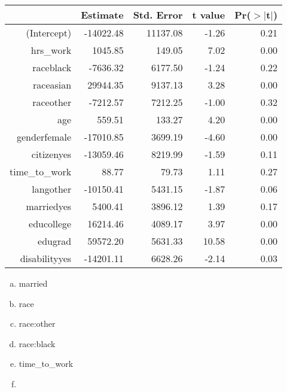 \documentclass[slidestop,compress,mathserif,12pt,t,professionalfonts,xcolor=table]{beamer}
\newcommand{\solnMult}[1]{#1}
\begin{document}

\begin{frame}
\frametitle{}


\begin{center}
{\tiny
\begin{tabular}{rrrrr}
  \hline
 & Estimate & Std. Error & t value & Pr($>$$|$t$|$) \\ 
  \hline
(Intercept) & -14022.48 & 11137.08 & -1.26 & 0.21 \\ 
  hrs\_work & 1045.85 & 149.05 & 7.02 & 0.00 \\ 
  raceblack & -7636.32 & 6177.50 & -1.24 & 0.22 \\ 
  raceasian & 29944.35 & 9137.13 & 3.28 & 0.00 \\ 
  raceother & -7212.57 & 7212.25 & -1.00 & 0.32 \\ 
  age & 559.51 & 133.27 & 4.20 & 0.00 \\ 
  genderfemale & -17010.85 & 3699.19 & -4.60 & 0.00 \\ 
  citizenyes & -13059.46 & 8219.99 & -1.59 & 0.11 \\ 
  time\_to\_work & 88.77 & 79.73 & 1.11 & 0.27 \\ 
  langother & -10150.41 & 5431.15 & -1.87 & 0.06 \\ 
  marriedyes & 5400.41 & 3896.12 & 1.39 & 0.17 \\ 
  educollege & 16214.46 & 4089.17 & 3.97 & 0.00 \\ 
  edugrad & 59572.20 & 5631.33 & 10.58 & 0.00 \\ 
  disabilityyes & -14201.11 & 6628.26 & -2.14 & 0.03 \\ 
   \hline
\end{tabular}
}
\end{center}

\begin{multicols}{2}
\begin{enumerate}[(a)]
\item married
\item race
\item race:other
\item race:black
\item \solnMult{time\_to\_work}
\item[]
\end{enumerate}
\end{multicols}

\end{frame}
\end{document}
